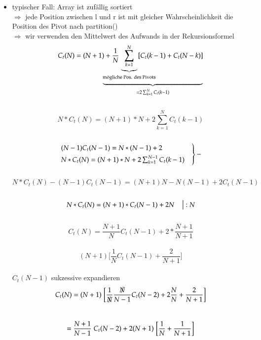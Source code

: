 \documentclass[11pt, fleqn]{scrreprt}
\begin{document}
\begin{itemize}
		\item typischer Fall: Array ist zufällig sortiert \\
		$\Rightarrow$ jede Position zwischen l und r ist mit gleicher Wahrscheinlichkeit die Position des Pivot nach partition() \\
		$\Rightarrow$ wir verwenden den Mittelwert des Aufwands in der Rekursionsformel \\
		\[C_t(N) = (N+1) + \frac{1}{N}  \hspace*{-9mm} \underbrace{\underbrace{\sum_{k=1}^N}_{\text{mögliche Pos. des Pivots}}\hspace*{-9mm} [C_t(k-1) + C_t(N-k)]}_{= 2 \sum_{k=1}^N C_t(k-1)} \]\\
		\vspace*{-6mm}
		\[N * C_t(N) = (N+1) * N + 2 \sum_{k=1}^N C_t(k-1)\] \\
		\vspace*{-6mm}
		\[ \begin{rcases}(N-1) C_t(N-1) = N*(N-1) + 2 & \\
		 N * C_t(N) = (N+1) * N + 2 \sum_{k=1}^{N-1} C_t(k-1) & \end{rcases} - \]\\
		 \vspace*{-6mm}
		\[N* C_t(N) - (N-1) C_t(N-1) = (N+1)N - N(N-1) + 2 C_t(N-1) \] \\
		\vspace*{-9mm}
		\[ N * C_t(N) = (N+1) * C_t(N-1) + 2N \hspace*{4mm} \big| :N\] \\
		\vspace*{-9mm}
		\[ C_t(N) = \frac{N+1}{N} C_t(N-1) + 2* \frac{N+1}{N+1} \] \\
		\vspace*{-9mm}
		\[ (N+1) \biggl\lbrack \frac{1}{N} C_t(N-1) + \frac{2}{N+1}\biggr\rbrack \] \\
		$ C_t(N-1)$ sukzessive expandieren \\
		\vspace*{-3mm}
		\[ C_t(N) = (N+1) \hspace*{1mm}  \biggl\lbrack \frac{1}{\slashed{N}} \frac{\slashed{N}}{N-1} C_t(N-2) + 2 \frac{N}{N} + \frac{2}{N+1}\biggr\rbrack\] \\
		\vspace*{-9mm}
		\[ = \frac{N+1}{N-1} \hspace*{1mm} C_t(N-2) + 2(N+1) \hspace*{1mm} \biggl\lbrack\frac{1}{N}+\frac{1}{N+1}\biggr\rbrack \]\\

\end{itemize}
\end{document}
